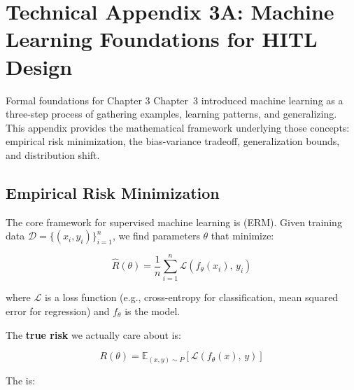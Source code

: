 
\chapter*{Technical Appendix 3A: Machine Learning Foundations for HITL Design}

\begin{chapterquote}{Formal foundations for Chapter 3}
Chapter~3 introduced machine learning as a three-step process of gathering examples, learning patterns, and generalizing. This appendix provides the mathematical framework underlying those concepts: empirical risk minimization, the bias-variance tradeoff, generalization bounds, and distribution shift.
\end{chapterquote}

\apxnumon
\section{Empirical Risk Minimization}

The core framework for supervised machine learning is  (ERM). Given training data $\mathcal{D} = \{(x_i, y_i)\}_{i=1}^n$, we find parameters $\theta$ that minimize:

\[
\hat{R}(\theta) = \frac{1}{n} \sum_{i=1}^{n} \mathcal{L}\!\left(f_\theta(x_i),\, y_i\right)
\]

where $\mathcal{L}$ is a loss function (e.g., cross-entropy for classification, mean squared error for regression) and $f_\theta$ is the model.

The \textbf{true risk} we actually care about is:

\[
R(\theta) = \mathbb{E}_{(x,y) \sim P}\!\left[\mathcal{L}\!\left(f_\theta(x),\, y\right)\right]
\]

The  is:

